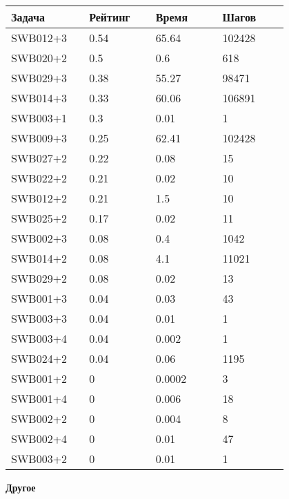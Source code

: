 \begin{longtable}[H]{|p{0.2\linewidth}|p{0.2\linewidth}|p{0.2\linewidth}|p{0.2\linewidth}|}
\hline
\textbf{Задача} & \textbf{Рейтинг} & \textbf{Время} & \textbf{Шагов} \\
\hline
SWB012+3 &  0.54 &  65.64 &  102428 \\
\hline
SWB020+2 &  0.5 &  0.6 &  618 \\
\hline
SWB029+3 &  0.38 &  55.27 &  98471 \\
\hline
SWB014+3 &  0.33 &  60.06 &  106891 \\
\hline
SWB003+1 &  0.3 &  0.01 &  1 \\
\hline
SWB009+3 &  0.25 &  62.41 &  102428 \\
\hline
SWB027+2 &  0.22 &  0.08 &  15 \\
\hline
SWB022+2 &  0.21 &  0.02 &  10 \\
\hline
SWB012+2 &  0.21 &  1.5 &  10 \\
\hline
SWB025+2 &  0.17 &  0.02 &  11 \\
\hline
SWB002+3 &  0.08 &  0.4 &  1042 \\
\hline
SWB014+2 &  0.08 &  4.1 &  11021 \\
\hline
SWB029+2 &  0.08 &  0.02 &  13 \\
\hline
SWB001+3 &  0.04 &  0.03 &  43 \\
\hline
SWB003+3 &  0.04 &  0.01 &  1 \\
\hline
SWB003+4 &  0.04 &  0.002 &  1 \\
\hline
SWB024+2 &  0.04 &  0.06 &  1195 \\
\hline
SWB001+2 &  0 &  0.0002 &  3 \\
\hline
SWB001+4 &  0 &  0.006 &  18 \\
\hline
SWB002+2 &  0 &  0.004 &  8 \\
\hline
SWB002+4 &  0 &  0.01 &  47 \\
\hline
SWB003+2 &  0 &  0.01 &  1 \\
\hline
\end{longtable}




\textbf{Другое}


